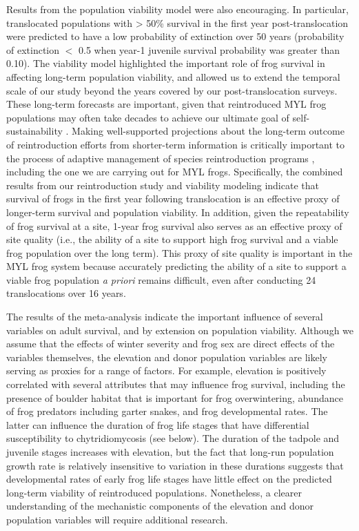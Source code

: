 \documentclass[9pt,twocolumn,twoside,lineno]{pnas-new}
\begin{document}
Results from the population viability model were also encouraging. In
particular, translocated populations with \textgreater{} 50\% survival
in the first year post-translocation were predicted to have a low
probability of extinction over 50 years (probability of extinction \(<\)
0.5 when year-1 juvenile survival probability was greater than 0.10).
The viability model highlighted the important role of frog survival in
affecting long-term population viability, and allowed us to extend the
temporal scale of our study beyond the years covered by our
post-translocation surveys. These long-term forecasts are important,
given that reintroduced MYL frog populations may often take decades to
achieve our ultimate goal of self-sustainability \citep{joseph2018}.
Making well-supported projections about the long-term outcome of
reintroduction efforts from shorter-term information is critically
important to the process of adaptive management of species
reintroduction programs \citep{seddon2007}, including the one we are
carrying out for MYL frogs. Specifically, the combined results from our
reintroduction study and viability modeling indicate that survival of
frogs in the first year following translocation is an effective proxy of
longer-term survival and population viability. In addition, given the
repeatability of frog survival at a site, 1-year frog survival also
serves as an effective proxy of site quality (i.e., the ability of a
site to support high frog survival and a viable frog population over the
long term). This proxy of site quality is important in the MYL frog
system because accurately predicting the ability of a site to support a
viable frog population \emph{a priori} remains difficult, even after
conducting 24 translocations over 16 years.

The results of the meta-analysis indicate the important influence of
several variables on adult survival, and by extension on population
viability. Although we assume that the effects of winter severity and
frog sex are direct effects of the variables themselves, the elevation
and donor population variables are likely serving as proxies for a range
of factors. For example, elevation is positively correlated with several
attributes that may influence frog survival, including the presence of
boulder habitat that is important for frog overwintering, abundance of
frog predators including garter snakes, and frog developmental rates.
The latter can influence the duration of frog life stages that have
differential susceptibility to chytridiomycosis (see below). The
duration of the tadpole and juvenile stages increases with elevation,
but the fact that long-run population growth rate is relatively
insensitive to variation in these durations suggests that developmental
rates of early frog life stages have little effect on the predicted
long-term viability of reintroduced populations. Nonetheless, a clearer
understanding of the mechanistic components of the elevation and donor
population variables will require additional research.
\end{document}
